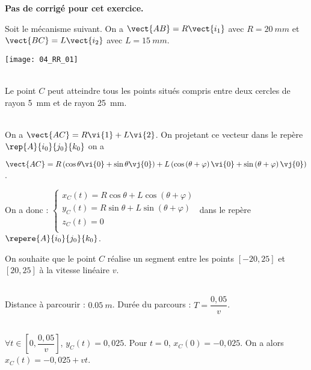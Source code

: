 \normaltrue
\correctionfalse


\setcounter{numques}{0}
\ifcorrection
\else
\textbf{Pas de corrigé pour cet exercice.}
\fi

\ifprof
\else
Soit le mécanisme suivant. On a $\vect{AB}=R\vect{i_1}$ avec $R=\SI{20}{mm}$ et  
$\vect{BC}=L\vect{i_2}$ avec $L=\SI{15}{mm}$.
\begin{center}
\texttt{[image: 04\_RR\_01]}
\end{center}
\fi

\ifprof~\\
Le point $C$ peut atteindre tous les points situés compris entre deux cercles de rayon \SI{5}{mm} et de rayon \SI{25}{mm}.
\else
\fi

\ifprof~\\
On  a $\vect{AC}=R\vi{1}+L\vi{2}$. On projetant ce vecteur dans le repère $\rep{A}{i_0}{j_0}{k_0}$ on a 

$\vect{AC}=R\left(\cos\theta \vi{0} + \sin\theta \vj{0}\right) +L\left(\cos\left(\theta+\varphi\right) \vi{0} + \sin\left(\theta+\varphi\right) \vj{0}\right)$. 

On a donc :
$\left\{
\begin{array}{l}
x_C(t)= R\cos\theta  +L\cos\left(\theta+\varphi\right)  \\
y_C(t)= R \sin\theta + L\sin\left(\theta+\varphi\right)\\
z_C(t)= 0\\
\end{array}
\right.
$ dans le repère $\repere{A}{i_0}{j_0}{k_0}$.
\else
\fi

\ifprof
\else
On souhaite que le point $C$ réalise un segment entre les points $[-20,25]$ et $[20,25]$ à la vitesse linéaire $v$. 
\fi


\ifprof ~\\
Distance à parcourir : $\SI{0,05}{m}$. Durée du parcours : $T=\dfrac{0,05}{v}$.
\else
\fi


\ifprof ~\\
$\forall t \in \left[0,\dfrac{0,05}{v}\right]$, $y_C(t)=0,025$. 
Pour $t=0$, $x_C(0)=-0,025$. On a alors $x_C(t)=-0,025+vt$.  

